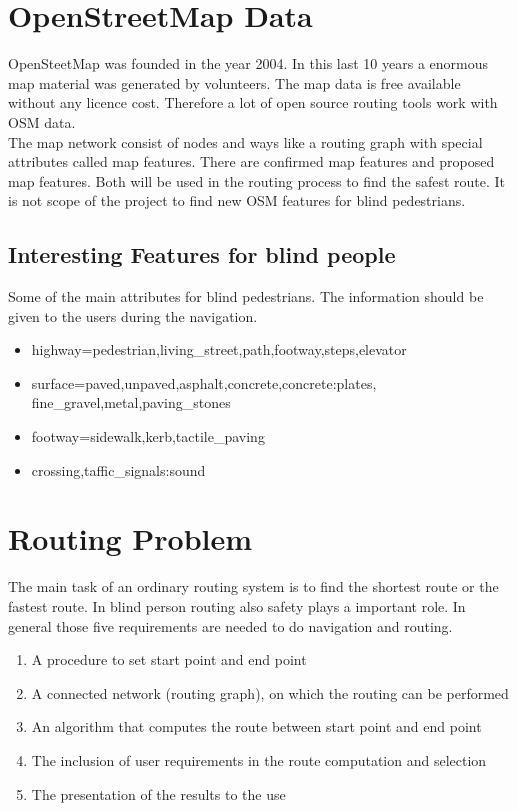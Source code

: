 \documentclass{sig-alternate}
\begin{document}
\section{OpenStreetMap Data}
OpenSteetMap was founded in the year 2004. In this last 10 years a enormous map material was generated by volunteers. The map data is free available without any licence cost. Therefore a lot of open source routing tools work with OSM data. \\
The map network consist of nodes and ways like a routing graph with special attributes called map features. There are confirmed map features and proposed map features.  Both will be used in the routing process to find the safest route. It is not scope of the project to find new OSM features for blind pedestrians.   

\subsection{Interesting Features for blind people}
Some of the main attributes for blind pedestrians. The information should be given to the users during the navigation.
\begin{itemize}
  \item highway=pedestrian,living\_street,path,footway,steps,elevator
  \item surface=paved,unpaved,asphalt,concrete,concrete:plates, \\ fine\_gravel,metal,paving\_stones
  \item footway=sidewalk,kerb,tactile\_paving
  \item crossing,taffic\_signals:sound  
\end{itemize}

\section{Routing Problem}
The main task of an ordinary routing system is to find the shortest route or the fastest route. In blind person routing also safety plays a important  role. In general those five requirements\cite{weyrer} are needed to do navigation and routing.
\begin{enumerate}
  \item A procedure to set start point and end point
  \item A connected network (routing graph), on which the routing can be performed
  \item An algorithm that computes the route between start point and end point
  \item The inclusion of user requirements in the route computation and selection
  \item The presentation of the results to the use
\end{enumerate}
\end{document}
